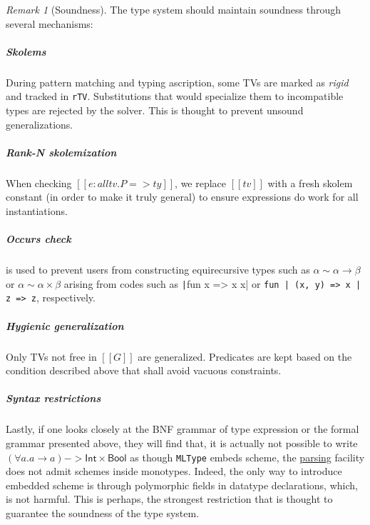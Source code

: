 \documentclass[a4paper, 11pt]{article}
\theoremstyle{remark}\newtheorem*{remark}{Remark}
\theoremstyle{definition}\newtheorem*{definition}{Definition}
\begin{document}
\begin{remark}[Soundness]
The type system should maintain soundness through several mechanisms:
\subparagraph*{Skolems} During pattern matching and typing ascription, some TVs
are marked as \emph{rigid} and tracked in \texttt{rTV}. Substitutions that would
specialize them to incompatible types are rejected by the solver. This is thought to
prevent unsound generalizations.
\subparagraph*{Rank-N skolemization} When checking \([[e : all tv. P => ty]]\), we replace
\([[tv]]\) with a fresh skolem constant (in order to make it truly general) to ensure
expressions do work for all instantiations.
\subparagraph*{Occurs check} is used to prevent users from constructing equirecursive types such as
\(\alpha \sim \alpha\to \beta\) or \(\alpha \sim \alpha\times\beta\) arising from codes such as \texttt|fun x => x x| or
\texttt{fun | (x, y) => x | z => z}, respectively.
\subparagraph*{Hygienic generalization} Only TVs not free in \([[G]]\) are generalized. Predicates
are kept based on the condition described above that shall avoid vacuous constraints.
\subparagraph*{Syntax restrictions} Lastly, if one looks closely at the BNF grammar of type expression or
the formal grammar presented above, they will find that, it is actually not possible to write
\((\forall a. a\to a) -> \mathsf{Int}\times \mathsf{Bool}\) as though \texttt{MLType} embeds scheme,
the \underline{parsing} facility does not admit schemes inside monotypes. Indeed, the only way
to introduce embedded scheme is through polymorphic fields in datatype declarations, which, is not
harmful. This is perhaps, the strongest restriction that is thought to guarantee the soundness of
the type system.
\end{remark}
\end{document}
